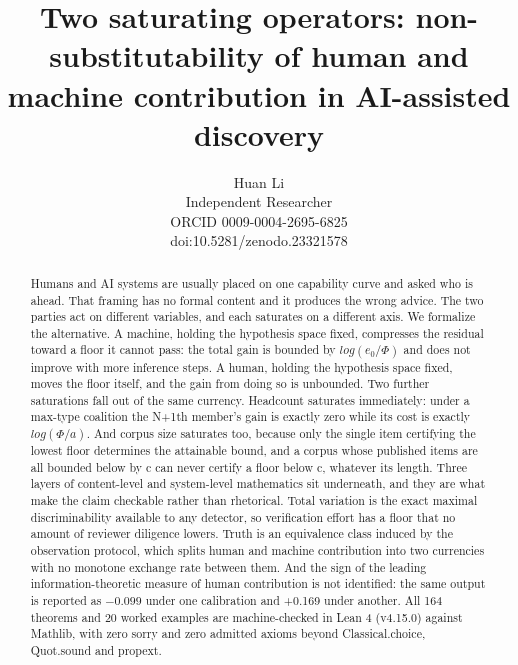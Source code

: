 \documentclass[11pt,a4paper]{article}
\theoremstyle{definition}
\theoremstyle{remark}
\begin{document}

\fancyhead[R]{\small\thepage}

\title{\textbf{Two saturating operators: non-substitutability of human and machine contribution in AI-assisted discovery}}
\author{Huan Li\\ \small Independent Researcher\\[6pt]        \small ORCID 0009-0004-2695-6825\\ \small doi:10.5281/zenodo.23321578}
\date{}

\maketitle
\thispagestyle{fancy}
\begin{abstract}
Humans and AI systems are usually placed on one capability curve and asked who is ahead. That framing has no formal content and it produces the wrong advice. The two parties act on different variables, and each saturates on a different axis.
We formalize the alternative. A machine, holding the hypothesis space fixed, compresses the residual toward a floor it cannot pass: the total gain is bounded by $log(e_0/Φ)$ and does not improve with more inference steps. A human, holding the hypothesis space fixed, moves the floor itself, and the gain from doing so is unbounded. Two further saturations fall out of the same currency. Headcount saturates immediately: under a max-type coalition the N+1th member's gain is exactly zero while its cost is exactly $log(Φ/a)$. And corpus size saturates too, because only the single item certifying the lowest floor determines the attainable bound, and a corpus whose published items are all bounded below by c can never certify a floor below c, whatever its length.
Three layers of content-level and system-level mathematics sit underneath, and they are what make the claim checkable rather than rhetorical. Total variation is the exact maximal discriminability available to any detector, so verification effort has a floor that no amount of reviewer diligence lowers. Truth is an equivalence class induced by the observation protocol, which splits human and machine contribution into two currencies with no monotone exchange rate between them. And the sign of the leading information-theoretic measure of human contribution is not identified: the same output is reported as $−0.099$ under one calibration and +0.169 under another.
All 164 theorems and 20 worked examples are machine-checked in Lean 4 (v4.15.0) against Mathlib, with zero sorry and zero admitted axioms beyond Classical.choice, Quot.sound and propext.
\end{abstract}
\end{document}
